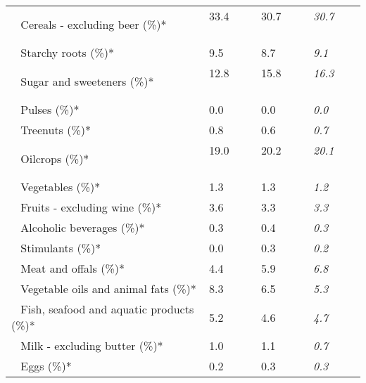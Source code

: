 \begin{tabular}{L{3.9cm} R{1cm} R{1cm} R{1cm}}
	 ~ Cereals - excluding beer (\%)* & 33.4 ~ \ \ & 30.7 ~ \ \ & \textit{30.7} ~ \ \ \\ 
	 ~ Starchy roots (\%)* & 9.5 ~ \ \ & 8.7 ~ \ \ & \textit{9.1} ~ \ \ \\ 
	 ~ Sugar and sweeteners (\%)* & 12.8 ~ \ \ & 15.8 ~ \ \ & \textit{16.3} ~ \ \ \\ 
	 ~ Pulses (\%)* & 0.0 ~ \ \ & 0.0 ~ \ \ & \textit{0.0} ~ \ \ \\ 
	 ~ Treenuts (\%)* & 0.8 ~ \ \ & 0.6 ~ \ \ & \textit{0.7} ~ \ \ \\ 
	 ~ Oilcrops (\%)* & 19.0 ~ \ \ & 20.2 ~ \ \ & \textit{20.1} ~ \ \ \\ 
	 ~ Vegetables (\%)* & 1.3 ~ \ \ & 1.3 ~ \ \ & \textit{1.2} ~ \ \ \\ 
	 ~ Fruits - excluding wine (\%)* & 3.6 ~ \ \ & 3.3 ~ \ \ & \textit{3.3} ~ \ \ \\ 
	 ~ Alcoholic beverages (\%)* & 0.3 ~ \ \ & 0.4 ~ \ \ & \textit{0.3} ~ \ \ \\ 
	 ~ Stimulants (\%)* & 0.0 ~ \ \ & 0.3 ~ \ \ & \textit{0.2} ~ \ \ \\ 
	 ~ Meat and offals (\%)* & 4.4 ~ \ \ & 5.9 ~ \ \ & \textit{6.8} ~ \ \ \\ 
	 ~ Vegetable oils and animal fats (\%)* & 8.3 ~ \ \ & 6.5 ~ \ \ & \textit{5.3} ~ \ \ \\ 
	 ~ Fish, seafood and aquatic products (\%)* & 5.2 ~ \ \ & 4.6 ~ \ \ & \textit{4.7} ~ \ \ \\ 
	 ~ Milk - excluding butter (\%)* & 1.0 ~ \ \ & 1.1 ~ \ \ & \textit{0.7} ~ \ \ \\ 
	 ~ Eggs (\%)* & 0.2 ~ \ \ & 0.3 ~ \ \ & \textit{0.3} ~ \ \ \\ 
       \toprule
      \end{tabular}
      \clearpage
{}
